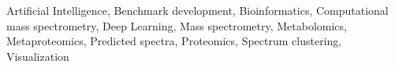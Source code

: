 Artificial Intelligence,
Benchmark development,
Bioinformatics,
Computational mass spectrometry,
Deep Learning,
Mass spectrometry,
Metabolomics,
Metaproteomics,
Predicted spectra,
Proteomics,
Spectrum clustering,
Visualization
